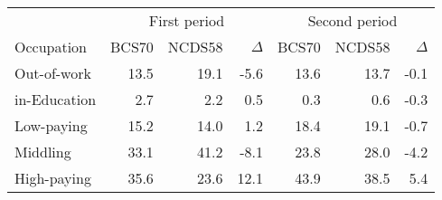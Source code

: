 
\begin{tabular}{lrrrrrr}
\toprule
\multicolumn{1}{c}{} & \multicolumn{3}{c}{First period} & \multicolumn{3}{c}{Second period} \\
\cmidrule(l{3pt}r{3pt}){2-4} \cmidrule(l{3pt}r{3pt}){5-7}
Occupation & BCS70 & NCDS58 & $\Delta$ & BCS70 & NCDS58 & $\Delta$\\
\midrule
Out-of-work & 13.5 & 19.1 & -5.6 & 13.6 & 13.7 & -0.1\\
in-Education & 2.7 & 2.2 & 0.5 & 0.3 & 0.6 & -0.3\\
Low-paying & 15.2 & 14.0 & 1.2 & 18.4 & 19.1 & -0.7\\
Middling & 33.1 & 41.2 & -8.1 & 23.8 & 28.0 & -4.2\\
High-paying & 35.6 & 23.6 & 12.1 & 43.9 & 38.5 & 5.4\\
\bottomrule
\end{tabular}
